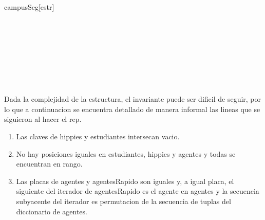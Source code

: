 \begin{Representacion}
  

  \begin{Estructura}{campusSeg}[estr]
    \begin{Tupla}[estr]
		\\
		\\
		\\		
		\\
    \end{Tupla}
    
    \begin{Tupla}[sanciones]
	\end{Tupla}
		
	\begin{Tupla}[posiciones]
		\\
		\\
	\end{Tupla}
	
    \begin{Tupla}[datosAg]
    \end{Tupla}
  \end{Estructura}

	Dada la complejidad de la estructura, el invariante puede ser dificil de seguir, por lo que a continuacion se encuentra detallado de manera informal las lineas que se siguieron al hacer el rep.
	
	\begin{enumerate}
		\item Las claves de hippies y estudiantes intersecan vacio.
		\item No hay posiciones iguales en estudiantes, hippies y agentes y todas se encuentran en rango.
		\item Las placas de agentes y agentesRapido son iguales y, a igual placa, el siguiente del iterador de agentesRapido es el agente en agentes y la secuencia subyacente del iterador es permutacion de la secuencia de tuplas del diccionario de agentes.
		

\end{enumerate}
\end{Representacion}
